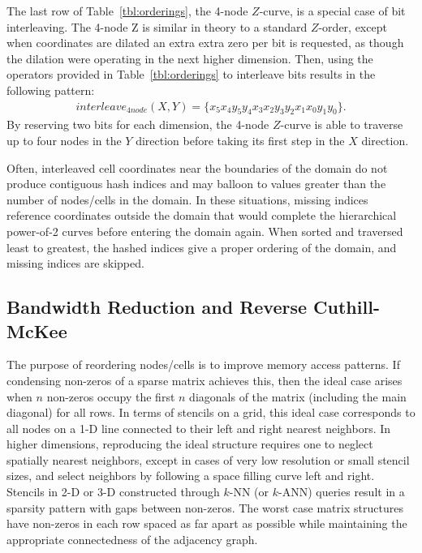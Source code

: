 \documentclass{report}
\begin{document}
The last row of Table~\ref{tbl:orderings}, the 4-node $Z$-curve, is a special case of bit interleaving. The 4-node Z is similar in theory to a standard $Z$-order, except when coordinates are dilated an extra extra zero per bit is requested, as though the dilation were operating in the next higher dimension. Then, using the operators provided in Table~\ref{tbl:orderings} to interleave bits results in the following pattern:
\begin{align}
interleave_{4node}(X,Y) = \{x_5x_4y_5y_4x_3x_2y_3y_2x_1x_0y_1y_0\}.
\end{align}
By reserving two bits for each dimension, the 4-node $Z$-curve is able to traverse up to four nodes in the $Y$ direction before taking its first step in the $X$ direction. 



Often, interleaved cell coordinates near the boundaries of the domain do not produce contiguous hash indices and may balloon to values greater than the number of nodes/cells in the domain. In these situations, missing indices reference coordinates outside the domain that would complete the hierarchical power-of-2 curves before entering the domain again. When sorted and traversed least to greatest, the hashed indices give a proper ordering of the domain, and missing indices are skipped. 



\subsection{Bandwidth Reduction and Reverse Cuthill-McKee} 

The purpose of reordering nodes/cells is to improve memory access patterns. If condensing non-zeros of a sparse matrix achieves this, then the ideal case arises when $n$ non-zeros occupy the first $n$ diagonals of the matrix (including the main diagonal) for all rows. In terms of stencils on a grid, this ideal case corresponds to all nodes on a 1-D line connected to their left and right nearest neighbors. In higher dimensions, reproducing the ideal structure requires one to neglect spatially nearest neighbors, except in cases of very low resolution or small stencil sizes, and select neighbors by following a space filling curve left and right. Stencils in 2-D or 3-D constructed through $k$-NN (or $k$-ANN) queries result in a sparsity pattern with gaps between non-zeros. The worst case matrix structures have non-zeros in each row spaced as far apart as possible while maintaining the appropriate connectedness of the adjacency graph. 
\end{document}
